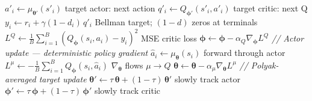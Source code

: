 \documentclass[11pt]{article}
\begin{document}
\begin{algorithm}[p]
\begin{minipage}[t]{0.68\linewidth}
\begin{algorithmic}[1]
        \State \hspace{\algorithmicindent} $a'_i \gets \mu_{\boldsymbol{\theta}'}(s'_i)$ \hfill target actor: next action
        \State \hspace{\algorithmicindent} $q'_i \gets Q_{\boldsymbol{\phi}'}(s'_i, a'_i)$ \hfill target critic: next Q
        \State \hspace{\algorithmicindent} $y_i \gets r_i + \gamma(1 - d_i)\, q'_i$ \hfill Bellman target; $(1{-}d)$ zeros at terminals
        \State $L^Q \gets \frac{1}{B}\sum_{i=1}^B (Q_{\boldsymbol{\phi}}(s_i, a_i) - y_i)^2$ \hfill MSE critic loss
        \State $\boldsymbol{\phi} \gets \boldsymbol{\phi} - \alpha_Q \nabla_{\boldsymbol{\phi}} L^Q$
        \Statex \hspace{\algorithmicindent}\hspace{\algorithmicindent}\hspace{\algorithmicindent}\textit{// Actor update --- deterministic policy gradient}
        \State $\hat{a}_i \gets \mu_{\boldsymbol{\theta}}(s_i)$ \hfill forward through actor
        \State $L^\mu \gets -\frac{1}{B}\sum_{i=1}^B Q_{\boldsymbol{\phi}}(s_i, \hat{a}_i)$ \hfill $\nabla_{\boldsymbol{\theta}}$ flows $\mu \to Q$
        \State $\boldsymbol{\theta} \gets \boldsymbol{\theta} - \alpha_\mu \nabla_{\boldsymbol{\theta}} L^\mu$
        \Statex \hspace{\algorithmicindent}\hspace{\algorithmicindent}\hspace{\algorithmicindent}\textit{// Polyak-averaged target update}
        \State $\boldsymbol{\theta}' \gets \tau\,\boldsymbol{\theta} + (1 - \tau)\,\boldsymbol{\theta}'$ \hfill slowly track actor
        \State $\boldsymbol{\phi}' \gets \tau\,\boldsymbol{\phi} + (1 - \tau)\,\boldsymbol{\phi}'$ \hfill slowly track critic
    \EndFor
\EndFor
\end{algorithmic}
\end{minipage}
\end{algorithm}
\end{document}
